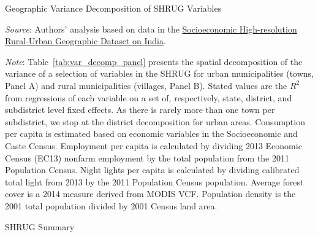 \documentclass[12pt,letterpaper]{article}
\newcommand{\HOME}{\string~}
\newcommand{\shrugpath}{.}
\begin{document}
\begin{appendix}

\newpage
\singlespace




\begin{table}[H]
  \caption{Geographic Variance Decomposition of SHRUG Variables} 

  \scriptsize{}
  
    \footnotesize
  \item \textit{Source}: Authors' analysis based on data in the \href{http://www.devdatalab.org/shrug}{Socioeconomic High-resolution
    Rural-Urban Geographic Dataset on India}.
  \item \textit{Note}: Table~\ref{tab:var_decomp_panel} presents the
    spatial decomposition of the variance of a selection of variables
    in the SHRUG for urban municipalities (towns, Panel A) and rural
    municipalities (villages, Panel B). Stated values are the $R^2$
    from regressions of each variable on a set of, respectively,
    state, district, and subdistrict level fixed effects. As there is
    rarely more than one town per subdistrict, we stop at the district
    decomposition for urban areas. Consumption per capita is estimated
    based on economic variables in the Socioeconomic and Caste
    Census. Employment per capita is calculated by dividing 2013
    Economic Census (EC13) nonfarm employment by the total population
    from the 2011 Population Census. Night lights per capita is
    calculated by dividing calibrated total light from 2013 by the
    2011 Population Census population. Average forest cover is a 2014
    measure derived from MODIS VCF. Population density is the 2001
    total population divided by 2001 Census land area.
    
  \label{tab:var_decomp_panel}
\end{table}


\newpage
\begin{landscape}
\begin{table}[H]\caption{SHRUG Summary}
  \footnotesize
  
  \label{tab:contents}
\end{table}
\end{landscape}
\newpage


\end{appendix}
\end{document}
